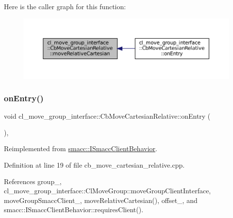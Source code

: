 Here is the caller graph for this function\+:
\nopagebreak
\begin{figure}[H]
\begin{center}
\leavevmode
\includegraphics[width=350pt]{classcl__move__group__interface_1_1CbMoveCartesianRelative_ae8443c7f81affe5c4450e83fc665487f_icgraph}
\end{center}
\end{figure}
\mbox{\label{classcl__move__group__interface_1_1CbMoveCartesianRelative_a7d65e3d5fa3f2c7b47d9cbe631f448ad}} 
\subsubsection{\texorpdfstring{on\+Entry()}{onEntry()}}
{\footnotesize\ttfamily void cl\+\_\+move\+\_\+group\+\_\+interface\+::\+Cb\+Move\+Cartesian\+Relative\+::on\+Entry (\begin{DoxyParamCaption}{ }\end{DoxyParamCaption})\hspace{0.3cm}{\ttfamily [override]}, {\ttfamily [virtual]}}



Reimplemented from \hyperlink{classsmacc_1_1ISmaccClientBehavior_a3ec24a839087c550e1d62a81e48cf530}{smacc\+::\+I\+Smacc\+Client\+Behavior}.



Definition at line 19 of file cb\+\_\+move\+\_\+cartesian\+\_\+relative.\+cpp.



References group\+\_\+, cl\+\_\+move\+\_\+group\+\_\+interface\+::\+Cl\+Move\+Group\+::move\+Group\+Client\+Interface, move\+Group\+Smacc\+Client\+\_\+, move\+Relative\+Cartesian(), offset\+\_\+, and smacc\+::\+I\+Smacc\+Client\+Behavior\+::requires\+Client().


